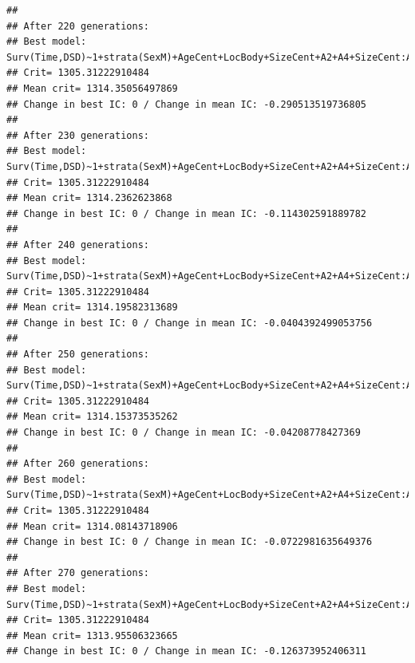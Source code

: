 \documentclass{article}\usepackage[]{graphicx}\usepackage[]{color}
\makeatletter
\newenvironment{kframe}{%
 \def\at@end@of@kframe{}%
 \ifinner\ifhmode%
  \def\at@end@of@kframe{\end{minipage}}%
  \begin{minipage}{\columnwidth}%
 \fi\fi%
 \def\FrameCommand##1{\hskip\@totalleftmargin \hskip-\fboxsep
 \colorbox{shadecolor}{##1}\hskip-\fboxsep
     \hskip-\linewidth \hskip-\@totalleftmargin \hskip\columnwidth}%
 \MakeFramed {\advance\hsize-\width
   \@totalleftmargin\z@ \linewidth\hsize
   \@setminipage}}%
 {\par\unskip\endMakeFramed%
 \at@end@of@kframe}
\newenvironment{knitrout}{}{} %
\makeatother
\begin{document}
\begin{knitrout}
\begin{kframe}
{\ttfamily\noindent\color{warningcolor}{\#\# Warning in fitter(X, Y, strats, offset, init, control, weights = weights, : Loglik converged before variable\ \ 14 ; beta may be infinite.}}\begin{verbatim}
## 
## After 220 generations:
## Best model: Surv(Time,DSD)~1+strata(SexM)+AgeCent+LocBody+SizeCent+A2+A4+SizeCent:AgeCent+strata(SexM):SizeCent
## Crit= 1305.31222910484
## Mean crit= 1314.35056497869
## Change in best IC: 0 / Change in mean IC: -0.290513519736805
## 
## After 230 generations:
## Best model: Surv(Time,DSD)~1+strata(SexM)+AgeCent+LocBody+SizeCent+A2+A4+SizeCent:AgeCent+strata(SexM):SizeCent
## Crit= 1305.31222910484
## Mean crit= 1314.2362623868
## Change in best IC: 0 / Change in mean IC: -0.114302591889782
## 
## After 240 generations:
## Best model: Surv(Time,DSD)~1+strata(SexM)+AgeCent+LocBody+SizeCent+A2+A4+SizeCent:AgeCent+strata(SexM):SizeCent
## Crit= 1305.31222910484
## Mean crit= 1314.19582313689
## Change in best IC: 0 / Change in mean IC: -0.0404392499053756
## 
## After 250 generations:
## Best model: Surv(Time,DSD)~1+strata(SexM)+AgeCent+LocBody+SizeCent+A2+A4+SizeCent:AgeCent+strata(SexM):SizeCent
## Crit= 1305.31222910484
## Mean crit= 1314.15373535262
## Change in best IC: 0 / Change in mean IC: -0.04208778427369
## 
## After 260 generations:
## Best model: Surv(Time,DSD)~1+strata(SexM)+AgeCent+LocBody+SizeCent+A2+A4+SizeCent:AgeCent+strata(SexM):SizeCent
## Crit= 1305.31222910484
## Mean crit= 1314.08143718906
## Change in best IC: 0 / Change in mean IC: -0.0722981635649376
## 
## After 270 generations:
## Best model: Surv(Time,DSD)~1+strata(SexM)+AgeCent+LocBody+SizeCent+A2+A4+SizeCent:AgeCent+strata(SexM):SizeCent
## Crit= 1305.31222910484
## Mean crit= 1313.95506323665
## Change in best IC: 0 / Change in mean IC: -0.126373952406311
\end{verbatim}



\end{kframe}
\end{knitrout}
\end{document}

